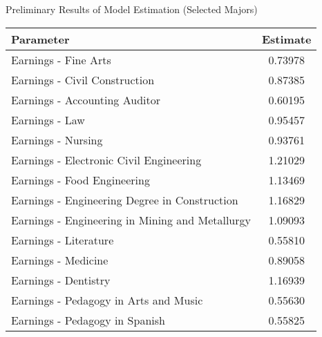 \documentclass[table,10pt]{beamer}
\begin{document}
\begin{frame}{Preliminary Results of Model Estimation (Selected Majors)}

\begin{center}
	\begin{tabular}{lc}
		\hline\hline
		\textbf{Parameter} & \textbf{Estimate} \\
		\hline
Earnings - Fine Arts                                                                 &            0.73978\\
Earnings - Civil Construction                                                        &            0.87385\\
Earnings - Accounting Auditor                                                        &            0.60195\\
Earnings - Law                                                                       &            0.95457\\
Earnings - Nursing                                                                   &            0.93761\\
Earnings - Electronic Civil Engineering                                              &            1.21029\\
Earnings - Food Engineering                                                          &            1.13469\\
Earnings - Engineering Degree in Construction                                        &            1.16829\\
Earnings - Engineering in Mining and Metallurgy                                      &            1.09093\\
Earnings - Literature                                                                &            0.55810\\
Earnings - Medicine                                                                  &            0.89058\\
Earnings - Dentistry                                                                 &            1.16939\\
Earnings - Pedagogy in Arts and Music                                                &            0.55630\\
Earnings - Pedagogy in Spanish                                                       &            0.55825\\ 
		\hline\hline
	\end{tabular}
\end{center}
\end{frame}
\end{document}
